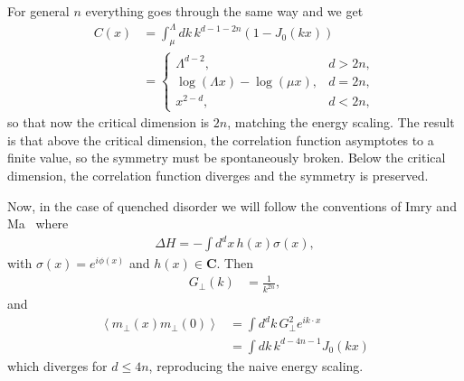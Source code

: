 \documentclass[12pt]{article}
\newcommand{\ex}[1]{\left\langle#1\right\rangle}
\newcommand{\nn}{\nonumber\\}
\renewcommand{\th}[1]{\frac{1}{#1}}
\begin{document}
For general $n$ everything goes through the same way and we get
\begin{align}
C(x) &= \int_\mu^\Lambda dk\, k^{d-1-2n} (1 - J_0(kx)) \nn
&= \begin{cases}
\Lambda^{d-2}, & d>2n,\\
\log(\Lambda x) - \log(\mu x), & d=2n,\\
x^{2-d}, & d<2n,
\end{cases}
\end{align}
so that now the critical dimension is $2n$, matching the energy scaling. The result is that above the critical dimension, the correlation function asymptotes to a finite value, so the symmetry must be spontaneously broken. Below the critical dimension, the correlation function diverges and the symmetry is preserved.

Now, in the case of quenched disorder we will follow the conventions of Imry and Ma~\cite{ImryMa} where
\begin{align}
\Delta H = -\int d^dx\, h(x) \sigma(x),
\end{align}
with $\sigma(x) = e^{i\phi(x)}$ and $h(x)\in \mathbf{C}$. Then 
\begin{align}
G_\perp(k) &= \th{k^{2n}},
\end{align}
and
\begin{align}
\ex{m_\perp(x)m_\perp(0)} &= \int d^dk\, G_\perp^2 e^{ik \cdot x}\nn
&= \int dk\, k^{d-4n-1}J_0(kx)
\end{align}
which diverges for $d\le 4n$, reproducing the naive energy scaling.



\end{document}
